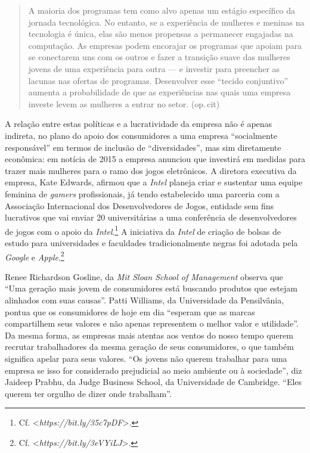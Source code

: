 \begin{quote}
A maioria dos programas tem como alvo apenas um estágio específico da
jornada tecnológica. No entanto, se a experiência de mulheres e meninas
na tecnologia é única, elas são menos propensas a permanecer engajadas
na computação. As empresas podem encorajar os programas que apoiam para
se conectarem uns com os outros e fazer a transição suave das mulheres
jovens de uma experiência para outra --- e investir para preencher as
lacunas nas ofertas de programas. Desenvolver esse ``tecido conjuntivo''
aumenta a probabilidade de que as experiências nas quais uma empresa
investe levem as mulheres a entrar no setor. (op.\,cit)
\end{quote}

A relação entre estas políticas e a lucratividade da empresa não é
apenas indireta, no plano do apoio dos consumidores a uma empresa
``socialmente responsável'' em termos de inclusão de ``diversidades'',
mas sim diretamente econômica: em notícia de 2015 a empresa anunciou que
investirá em medidas para trazer mais mulheres para o ramo dos jogos
eletrônicos. A diretora executiva da empresa, Kate Edwards, afirmou que
a \emph{Intel} planeja criar e sustentar uma equipe feminina de
\emph{gamers} profissionais, já tendo estabelecido uma parceria com a
Associação Internacional dos Desenvolvedores de Jogos, entidade sem fins
lucrativos que vai enviar 20 universitárias a uma conferência de
desenvolvedores de jogos com o apoio da \emph{Intel}.\footnote{Cf.
  \textless{}\emph{https://bit.ly/35c7pDF}\textgreater{}.}
A iniciativa da \emph{Intel} de criação de bolsas de estudo para
universidades e faculdades tradicionalmente negras foi adotada pela
\emph{Google} e \emph{Apple}.\footnote{Cf.
  \textless{}\emph{https://bit.ly/3eVYiLJ}\textgreater{}.}

Renee Richardson Gosline, da \emph{Mit Sloan School of Management}
observa que ``Uma geração mais jovem de consumidores está buscando
produtos que estejam alinhados com suas causas''. Patti Williams, da
Universidade da Pensilvânia, pontua que os consumidores de hoje em dia
``esperam que as marcas compartilhem seus valores e não apenas
representem o melhor valor e utilidade''. Da mesma forma, as empresas
mais atentas aos ventos do nosso tempo querem recrutar trabalhadores da
mesma geração de seus consumidores, o que também significa apelar para
seus valores. ``Os jovens não querem trabalhar para uma empresa se isso
for considerado prejudicial ao meio ambiente ou à sociedade'', diz
Jaideep Prabhu, da Judge Business School, da Universidade de Cambridge.
``Eles querem ter orgulho de dizer onde trabalham''.

